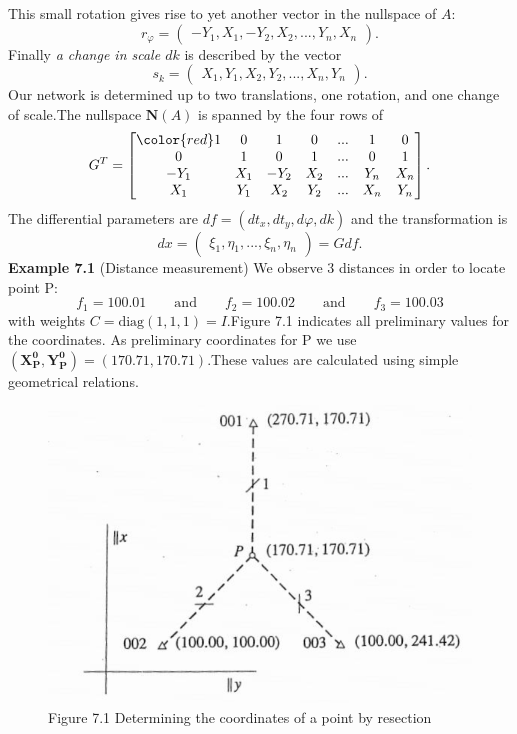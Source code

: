 This small rotation gives rise to yet another vector in the nullspace of $A$:
\begin{equation}
	r_{\varphi} =
	\begin{pmatrix}
		-Y_1,X_1,-Y_2,X_2,...,Y_n,X_n
	\end{pmatrix}.
\end{equation}
Finally \emph{a change in scale $dk$} is described by the vector
\begin{equation}
	s_k =
	\begin{pmatrix}
		X_1,Y_1,X_2,Y_2,...,X_n,Y_n
	\end{pmatrix}.
\end{equation}
Our network is determined up to two translations, one rotation, and one change of scale.The nullspace $\textbf{N}(A)$ is spanned by the four rows of
\begin{equation}
	G^T =
	\begin{bmatrix}
		\color{red} 1&0&1&0&...&1&0\\
		0&1&0&1&...&0&1\\
		-Y_1&X_1&-Y_2&X_2&...&Y_n&X_n\\
		X_1&Y_1&X_2&Y_2&...&X_n&Y_n
	\end{bmatrix}.
\end{equation}
The differential parameters are $df = (dt_x,dt_y,d\varphi,dk)$ and the transformation is
\begin{equation}
	dx =
	\begin{pmatrix}
		\xi_1,\eta_1,...,\xi_n,\eta_n
	\end{pmatrix}
	= G df.
\end{equation}
\textbf{Example 7.1} (Distance measurement) We observe 3 distances in order to locate point P:
\begin{equation}
	f_1 = 100.01\qquad \text{and}\qquad f_2 = 100.02\qquad \text{and}\qquad f_3 = 100.03
\end{equation}
with weights $C = \text{diag}(1,1,1) = I$.Figure 7.1 indicates all preliminary values for the coordinates. As preliminary coordinates for P we use $(\mathbf{X_{P}^{0}},\mathbf{Y_{P}^{0}}) = (170.71, 170.71)$.These values are calculated using simple geometrical relations.
\begin{figure}
	\centering
	\includegraphics[width=0.4\linewidth]{TeX_files/Part02/chapter07/image/7-1}
	\caption{Figure 7.1 Determining the coordinates of a point by resection}
	\label{fig:7-1}
\end{figure}

